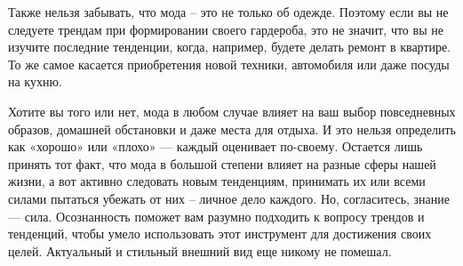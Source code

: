Также нельзя забывать, что мода – это не только об одежде. Поэтому если вы не следуете трендам при формировании своего гардероба, это не значит, что вы не изучите последние тенденции, когда, например, будете делать ремонт в квартире. То же самое касается приобретения новой техники, автомобиля или даже посуды на кухню.

Хотите вы того или нет, мода в любом случае влияет на ваш выбор повседневных образов, домашней обстановки и даже места для отдыха. И это нельзя определить как «хорошо» или «плохо» — каждый оценивает по-своему. Остается лишь принять тот факт, что мода в большой степени влияет на разные сферы нашей жизни, а вот активно следовать новым тенденциям, принимать их или всеми силами пытаться убежать от них – личное дело каждого. Но, согласитесь, знание — сила. Осознанность поможет вам разумно подходить к вопросу трендов и тенденций, чтобы умело использовать этот инструмент для достижения своих целей. Актуальный и стильный внешний вид еще никому не помешал.